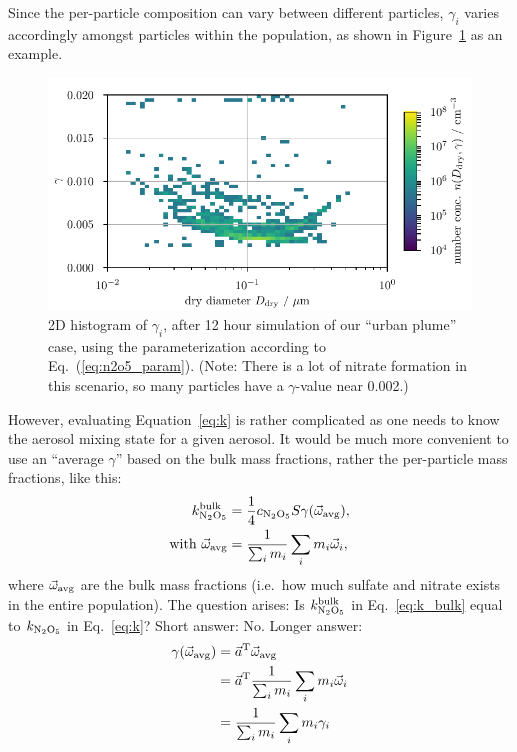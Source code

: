 \documentclass[11pt]{article}
\begin{document}
Since the per-particle composition can vary between different
particles, $\gamma_i$ varies accordingly amongst particles within the
population, as shown in Figure~\ref{fig:2Dgamma} as an example.
\begin{figure}
  \centering
  \includegraphics{urban_plume_diam_gamma_dist_00000012}
  \caption{2D histogram of $\gamma_i$, after 12 hour simulation of our
    ``urban plume'' case, using the parameterization according to
    Eq.~(\ref{eq:n2o5_param}). (Note: There is a lot of nitrate
    formation in this scenario, so many particles have a
    $\gamma$-value near 0.002.) \label{fig:2Dgamma}}
\end{figure}
However, evaluating Equation~\ref{eq:k} is rather complicated as one
needs to know the aerosol mixing state for a given aerosol. It would
be much more convenient to use an ``average $\gamma$'' based on the
bulk mass fractions, rather the per-particle mass fractions, like
this:
\begin{align} \label{eq:k_bulk}
  k^{\rm bulk}_{\rm N_2O_5} & = \frac{1}{4} c_{\rm  N_2O_5} S \gamma(\vec{\omega}_{\rm avg}), \\
  \text{with } \vec{\omega}_{\rm avg} & = \frac{1}{\sum_i m_i} \sum_i m_i \vec{\omega}_i,
\end{align}
where $\vec{\omega}_{\rm avg}$ are the bulk mass fractions (i.e.\ how
much sulfate and nitrate exists in the entire population). The
question arises: Is $k^{\rm bulk}_{\rm N_2O_5}$ in Eq.~\ref{eq:k_bulk}
equal to $k_{\rm N_2O_5}$ in Eq.~\ref{eq:k}? Short answer: No. Longer
answer:
\begin{align}
  \gamma(\vec{\omega}_{\rm avg}) & =  \vec{a}^{\rm T} \vec{\omega}_{\rm avg} \\
  \qquad &  = \vec{a}^{\rm T} \frac{1}{\sum_i m_i} \sum_i m_i \vec{\omega}_i \\
  \qquad & = \frac{1}{\sum_i m_i} \sum_i m_i \gamma_i
\end{align}
\end{document}

